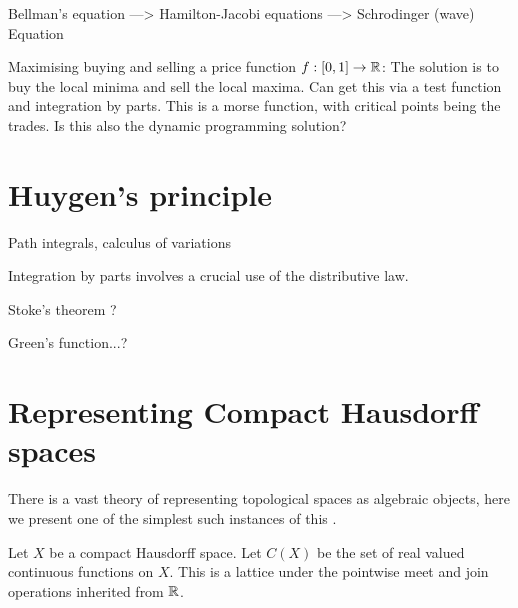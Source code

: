 \documentclass[11pt]{article}
\begin{document}
Bellman's equation ---> Hamilton-Jacobi equations ---> Schrodinger (wave) Equation


Maximising buying and selling a price function $f:[0,1]\to \mathbb R$:
    The solution is to buy the local minima and sell the
    local maxima. Can get this via a test function and
    integration by parts. This is a morse function, with
    critical points being the trades.
    Is this also the dynamic programming solution?

%
%

\section{Huygen's principle}

Path integrals, calculus of variations

Integration by parts involves a crucial use of the distributive law.

Stoke's theorem ? %

Green's function...?


\section{Representing Compact Hausdorff spaces}


There is a vast theory of representing topological spaces as
algebraic objects, here we present one of the simplest such
instances of this
\cite{Nagata1985}.


Let $X$ be a compact Hausdorff space.
Let $C(X)$ be the set of real valued continuous functions on $X$.
This is a lattice under the pointwise meet and join operations inherited from $\mathbb R$.
\end{document}
